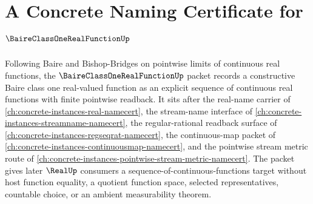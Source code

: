 \chapter{A Concrete Naming Certificate for $\BaireClassOneRealFunctionUp$}
\label{ch:concrete-instances-baire-class-one-real-function-namecert}

Following Baire and Bishop-Bridges on pointwise limits of continuous real functions, the $\BaireClassOneRealFunctionUp$ packet records a constructive Baire class one real-valued function as an explicit sequence of continuous real functions with finite pointwise readback. It sits after the real-name carrier of \autoref{ch:concrete-instances-real-namecert}, the stream-name interface of \autoref{ch:concrete-instances-streamname-namecert}, the regular-rational readback surface of \autoref{ch:concrete-instances-regseqrat-namecert}, the continuous-map packet of \autoref{ch:concrete-instances-continuousmap-namecert}, and the pointwise stream metric route of \autoref{ch:concrete-instances-pointwise-stream-metric-namecert}. The packet gives later $\RealUp$ consumers a sequence-of-continuous-functions target without host function equality, a quotient function space, selected representatives, countable choice, or an ambient measurability theorem.

